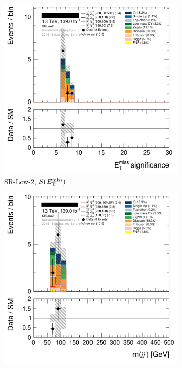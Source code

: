 \begin{figure}[tp]
\centering
\begin{subfigure}{0.48\textwidth}
\centering
\includegraphics[width=\textwidth]{figures/2ljets_def_met_Sign_SRLow2.png}
\caption{SR-Low-2, $S(E_\mathrm{T}^\mathrm{miss})$}
\end{subfigure}
\hfill
\begin{subfigure}{0.48\textwidth}
\centering
\includegraphics[width=\textwidth]{figures/2ljets_def_mjj_SRLow2.png}

\end{subfigure}
\end{figure}
